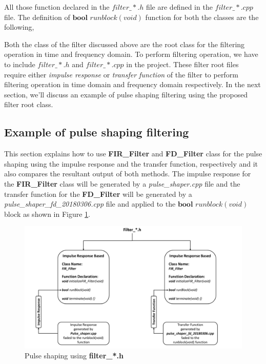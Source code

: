 \begin{refsection}
All those function declared in the $filter\_*.h$ file are defined in the $filter\_*.cpp$ file. The definition of $\textbf{bool}$ $runblock(void)$ function for both the classes are the following,


Both the class of the filter discussed above are the root class for the filtering operation in time and frequency domain. To perform filtering operation, we have to include  $filter\_*.h$ and $filter\_*.cpp$ in the project. These filter root files require either \textit{impulse response} or \textit{transfer function} of the filter to perform filtering operation in time domain and frequency domain respectively. In the next section, we'll discuss an example of pulse shaping filtering using the proposed filter root class.

\subsection*{Example of pulse shaping filtering}
This section explains how to use \textbf{FIR\_Filter} and \textbf{FD\_Filter} class for the pulse shaping using the impulse response and the transfer function, respectively and it also compares the resultant output of both methods.
The impulse response for the \textbf{FIR\_Filter} class will be generated by a \textit{pulse\_shaper.cpp} file and the transfer function for the \textbf{FD\_Filter} will be generated by a \textit{pulse\_shaper\_fd\_20180306.cpp} file and applied to the $\textbf{bool}$ $runblock(void)$ block as shown in Figure \ref{Pulse_shaping}.
\begin{figure}[h]
	\centering
	\includegraphics[width=17cm]{./algorithms/filter/figures/Pulse_shaping.pdf}
	\caption{Pulse shaping using \textbf{filter\_*.h}}
	\label{Pulse_shaping}
\end{figure}

\end{refsection}
